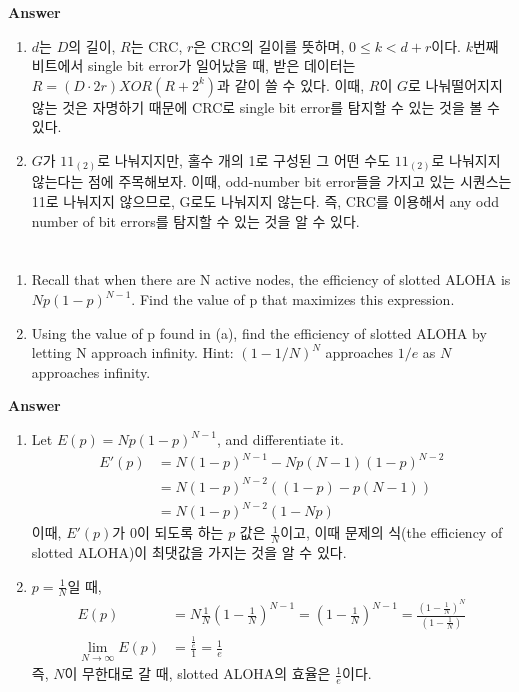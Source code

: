 \documentclass{article}
\begin{document}
    \noindent
    \textbf{Answer} \\
    \begin{enumerate} [label=\alph*. ]
        \item $d$는 $D$의 길이, $R$는 CRC, $r$은 CRC의 길이를 뜻하며, $0 \leq k < d+r$이다. $k$번째 비트에서 single bit error가 일어났을 때, 받은 데이터는 $R=(D\cdot 2r) XOR (R + 2^k)$과 같이 쓸 수 있다. 이때, $R$이 $G$로 나눠떨어지지 않는 것은 자명하기 때문에 CRC로 single bit error를 탐지할 수 있는 것을 볼 수 있다.
        \item $G$가 $11_{(2)}$로 나눠지지만, 홀수 개의 1로 구성된 그 어떤 수도 $11_{(2)}$로 나눠지지 않는다는 점에 주목해보자. 이때, odd-number bit error들을 가지고 있는 시퀀스는 11로 나눠지지 않으므로, G로도 나눠지지 않는다. 즉, CRC를 이용해서 any odd number of bit errors를 탐지할 수 있는 것을 알 수 있다.
    \end {enumerate}
    \vspace{2em}
    \section{}
    \begin{enumerate}[label=\alph*. ]
        \item Recall that when there are N active nodes, the efficiency of slotted ALOHA is $Np(1−p)^{N-1}$. Find the value of p that maximizes this expression.\\
        \item Using the value of p found in (a), find the efficiency of slotted ALOHA by letting N approach infinity. Hint: $(1−1/ N)^N$ approaches $1/e$ as $N$ approaches infinity.\\
    \end {enumerate}
    \noindent
    \textbf{Answer} \\
    \begin{enumerate} [label=\alph*. ]
        \item Let $E(p) = Np(1-p)^{N-1}$, and differentiate it.
              \begin{align*}
                  E'(p) &= N(1-p)^{N-1} - Np(N-1)(1-p)^{N-2} \\
                  &= N(1-p)^{N-2}((1-p) - p(N-1)) \\
                  &= N(1-p)^{N-2}(1-Np)
              \end{align*}
              이때, $E'(p)$가 0이 되도록 하는 $p$ 값은 $\frac{1}{N}$이고, 이때 문제의 식(the efficiency of slotted ALOHA)이 최댓값을 가지는 것을 알 수 있다.
        \item $p=\frac{1}{N}$일 때,
              \begin{align*}
                   E(p) &= N\frac{1}{N}(1-\frac{1}{N})^{N-1} = (1-\frac{1}{N})^{N-1} = \frac{(1-\frac{1}{N})^{N}}{(1-\frac{1}{N})} \\
                   \lim_{N\to\infty} E(p) &= \frac{\frac{1}{e}}{1} = \frac{1}{e}
              \end{align*}
              즉, $N$이 무한대로 갈 때, slotted ALOHA의 효율은 $\frac{1}{e}$이다.
    \end {enumerate}
\end{document}
